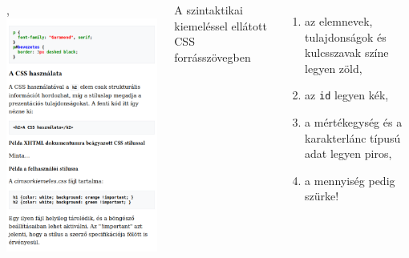 \begin{frame}
  \begin{columns}[c]
      \begin{exampleblock}{, }
        \includegraphics[width=\textwidth]{css3.png}
      \end{exampleblock}
      A szintaktikai kiemeléssel ellátott CSS forrásszövegben
      \begin{enumerate}
        \setcounter{enumi}{\thefeladatSzamlalo}
        \item az elemnevek, tulajdonságok és kulcsszavak színe legyen zöld,
        \item az \texttt{id} legyen kék,
        \item a mértékegység és a karakterlánc típusú adat legyen piros,
        \item a mennyiség pedig szürke!
      \end{enumerate}
  \end{columns}
\end{frame}

